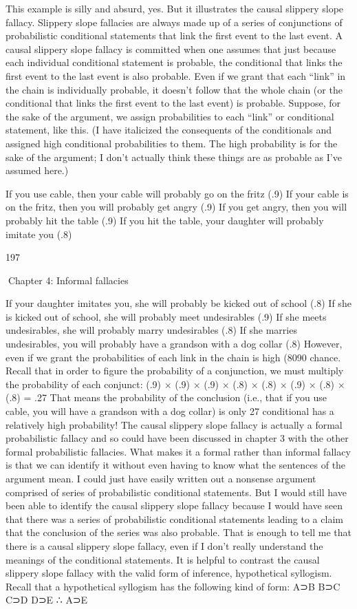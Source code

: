 This example is silly and absurd, yes. But it illustrates the causal slippery slope
fallacy. Slippery slope fallacies are always made up of a series of conjunctions of
probabilistic conditional statements that link the first event to the last event. A
causal slippery slope fallacy is committed when one assumes that just because
each individual conditional statement is probable, the conditional that links the
first event to the last event is also probable. Even if we grant that each “link” in
the chain is individually probable, it doesn’t follow that the whole chain (or the
conditional that links the first event to the last event) is probable. Suppose, for
the sake of the argument, we assign probabilities to each “link” or conditional
statement, like this. (I have italicized the consequents of the conditionals and
assigned high conditional probabilities to them. The high probability is for the
sake of the argument; I don’t actually think these things are as probable as I’ve
assumed here.)

If you use cable, then your cable will probably go on the fritz (.9)
If your cable is on the fritz, then you will probably get angry (.9)
If you get angry, then you will probably hit the table (.9)
If you hit the table, your daughter will probably imitate you (.8)

197

Chapter 4: Informal fallacies

If your daughter imitates you, she will probably be kicked out of school
(.8)
If she is kicked out of school, she will probably meet undesirables (.9)
If she meets undesirables, she will probably marry undesirables (.8)
If she marries undesirables, you will probably have a grandson with a dog
collar (.8)
However, even if we grant the probabilities of each link in the chain is high (8090%
chance. Recall that in order to figure the probability of a conjunction, we must
multiply the probability of each conjunct:
(.9) × (.9) × (.9) × (.8) × (.8) × (.9) × (.8) × (.8) = .27
That means the probability of the conclusion (i.e., that if you use cable, you will
have a grandson with a dog collar) is only 27%
conditional has a relatively high probability! The causal slippery slope fallacy is
actually a formal probabilistic fallacy and so could have been discussed in
chapter 3 with the other formal probabilistic fallacies. What makes it a formal
rather than informal fallacy is that we can identify it without even having to know
what the sentences of the argument mean. I could just have easily written out a
nonsense argument comprised of series of probabilistic conditional statements.
But I would still have been able to identify the causal slippery slope fallacy
because I would have seen that there was a series of probabilistic conditional
statements leading to a claim that the conclusion of the series was also probable.
That is enough to tell me that there is a causal slippery slope fallacy, even if I
don’t really understand the meanings of the conditional statements.
It is helpful to contrast the causal slippery slope fallacy with the valid form of
inference, hypothetical syllogism. Recall that a hypothetical syllogism has the
following kind of form:
A⊃B
B⊃C
C⊃D
D⊃E
∴ A⊃E

